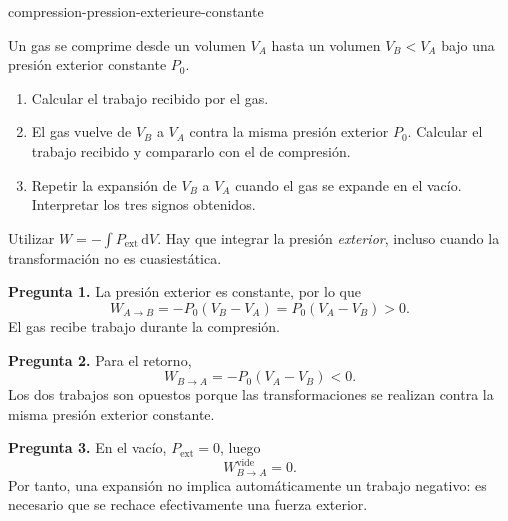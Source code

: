 \begin{exo}{compression-pression-exterieure-constante}

Un gas se comprime desde un volumen $V_A$ hasta un volumen $V_B<V_A$ bajo
una presión exterior constante $P_0$.

\begin{enumerate}
\item Calcular el trabajo recibido por el gas.
\item El gas vuelve de $V_B$ a $V_A$ contra la misma presión exterior $P_0$. Calcular el trabajo recibido y compararlo con el de compresión.
\item Repetir la expansión de $V_B$ a $V_A$ cuando el gas se expande en el vacío. Interpretar los tres signos obtenidos.
\end{enumerate}

\begin{indication}
Utilizar $W=-\int P_{\mathrm{ext}}\,\mathrm{d}V$. Hay que integrar la presión
\emph{exterior}, incluso cuando la transformación no es cuasiestática.
\end{indication}

\begin{solution}
\textbf{Pregunta 1.} La presión exterior es constante, por lo que
\[W_{A\to B}=-P_0(V_B-V_A)=P_0(V_A-V_B)>0.\]
El gas recibe trabajo durante la compresión.

\textbf{Pregunta 2.} Para el retorno,
\[W_{B\to A}=-P_0(V_A-V_B)<0.\]
Los dos trabajos son opuestos porque las transformaciones se realizan contra
la misma presión exterior constante.

\textbf{Pregunta 3.} En el vacío, $P_{\mathrm{ext}}=0$, luego
\[W_{B\to A}^{\mathrm{vide}}=0.\]
Por tanto, una expansión no implica automáticamente un trabajo negativo: es
necesario que se rechace efectivamente una fuerza exterior.
\end{solution}
\end{exo}
